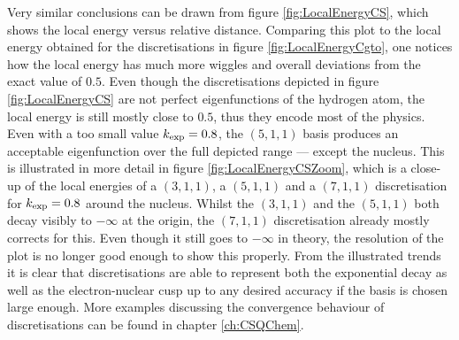 Very similar conclusions can be drawn
from figure \vref{fig:LocalEnergyCS},
which shows the local energy versus relative distance.
Comparing this plot to the local energy obtained for the \cGTO
discretisations in figure \vref{fig:LocalEnergyCgto},
one notices how the \cGTO local energy has much more wiggles
and overall deviations from the exact value of $0.5$.
Even though the \CS discretisations depicted
in figure \ref{fig:LocalEnergyCS} are not perfect eigenfunctions
of the hydrogen atom,
the local energy is still mostly close to $0.5$,
thus they encode most of the physics.
Even with a too small value $k_\text{exp} = 0.8$,
the $(5,1,1)$ basis produces an acceptable eigenfunction over the full depicted
range --- except the nucleus.
This is illustrated in more detail in figure
\ref{fig:LocalEnergyCSZoom},
which is a close-up of the local energies of a $(3,1,1)$, a $(5,1,1)$
and a $(7,1,1)$ discretisation for $k_\text{exp} = 0.8$
around the nucleus.
Whilst the $(3,1,1)$ and the $(5,1,1)$ both decay visibly to $-\infty$ at the origin,
the $(7,1,1)$ discretisation already mostly corrects for this.
Even though it still goes to $-\infty$ in theory,
the resolution of the plot is no longer good enough to show this properly.
From the illustrated trends it is clear that
\CS discretisations are able to represent
both the exponential decay as well as the electron-nuclear cusp
up to any desired accuracy if the basis is chosen large enough.
More examples discussing the convergence behaviour of
\CS discretisations can be found in chapter \vref{ch:CSQChem}.


